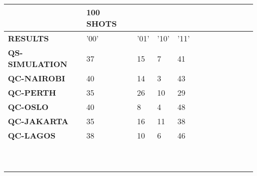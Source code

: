 \begin{table}[!ht]
    \centering
    \begin{tabular}{llllllllll}
    \hline
        \textbf{} & \textbf{100 SHOTS} & \textbf{} & \textbf{} & \textbf{ } & \textbf{} & \textbf{} & \textbf{} & \textbf{} & \textbf{} \\ \hline
        \textbf{RESULTS} & '00' & '01' & '10' & '11'  & ~ & ~ & ~ & ~ & ~ \\ 
        \textbf{QS-SIMULATION} & 37 & 15 & 7 & 41  & ~ & ~ & ~ & ~ & ~ \\ 
        \textbf{QC-NAIROBI} & 40 & 14 & 3 & 43  & ~ & ~ & ~ & ~ & ~ \\ 
        \textbf{QC-PERTH} & 35 & 26 & 10 & 29  & ~ & ~ & ~ & ~ & ~ \\ 
        \textbf{QC-OSLO} & 40 & 8 & 4 & 48  & ~ & ~ & ~ & ~ & ~ \\ 
        \textbf{QC-JAKARTA} & 35 & 16 & 11 & 38  & ~ & ~ & ~ & ~ & ~ \\ 
        \textbf{QC-LAGOS} & 38 & 10 & 6 & 46 & ~ & ~ & ~ & ~ & ~ \\ 
        \textbf{} & ~ & ~ & ~ & ~ & ~ & ~ & ~ & ~ & ~ \\ 
        \textbf{} & ~ & ~ & ~ & ~ & ~ & ~ & ~ & ~ & ~ \\ \hline
    \end{tabular}
\end{table}

